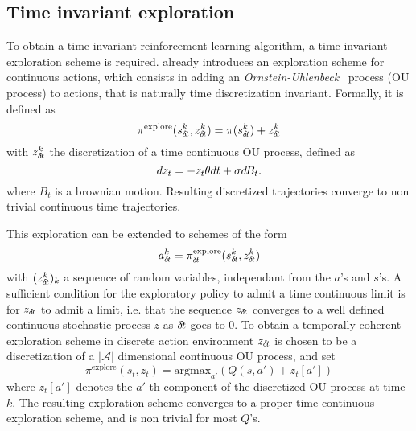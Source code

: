 \subsection{Time invariant exploration}
\label{subsec:explo}
To obtain a time invariant reinforcement learning algorithm, a time invariant
exploration scheme is required. 
\cite{ddpg} already introduces an exploration scheme for continuous actions, which consists in adding an
\emph{Ornstein-Uhlenbeck}~\cite{orn-uhl} process (OU process) to actions, that is naturally time
discretization invariant. Formally, it is defined as
\begin{equation}
	\pi^\text{explore}(s^k_{\delta\hspace{-.1em}t}, z^k_{\delta\hspace{-.1em}t}) = \pi(s^k_{\delta\hspace{-.1em}t}) + z^k_{\delta\hspace{-.1em}t}
\end{equation}
with $z^k_{\delta\hspace{-.1em}t}$ the discretization of a time continuous OU process, defined as
\begin{equation}
	dz_t = - z_t \theta dt + \sigma d\hspace{-.1em}B_t.
	\label{eq:orn_uhl}
\end{equation}
where $B_t$ is a brownian motion. Resulting discretized trajectories converge
to non trivial continuous time trajectories.

This exploration can be extended to schemes of the form
\begin{equation}
  \label{eq:explore}
	a^k_{\delta\hspace{-.1em}t} = \pi^\text{explore}_{\delta\hspace{-.1em}t}(s^k_{\delta\hspace{-.1em}t}, z^k_{\delta\hspace{-.1em}t})
\end{equation}
with $(z^k_{\delta\hspace{-.1em}t})_k$ a sequence of random variables, independant from the $a$'s and $s$'s.
A sufficient condition for the exploratory policy to admit a time continuous
limit is for
$z_{\delta\hspace{-.1em}t}$ to admit a limit, i.e. that the sequence $z_{\delta\hspace{-.1em}t}$ converges to a
well defined continuous stochastic process $z$ as ${\delta\hspace{-.1em}t}$ goes to $0$.
To obtain a temporally coherent exploration scheme in discrete action environment
$z_{\delta\hspace{-.1em}t}$ is chosen to be a discretization of a $|\mathcal{A}|$ dimensional
continuous OU process, and set
\begin{equation}
  \pi^\text{explore}(s_t, z_t)= \text{argmax}_{a'} \left(Q(s, a') + z_t[a']\right)
\end{equation}
where $z_t[a']$ denotes the $a'$-th component of the discretized OU process at time
$k$. The resulting exploration scheme converges to a proper time continuous exploration scheme,
and is non trivial for most $Q$'s.

